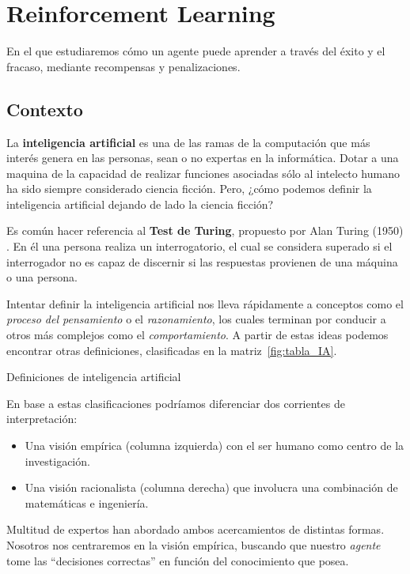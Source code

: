 \chapter{Reinforcement Learning}
\label{cap:reinforcementLearning}

En el que estudiaremos cómo un agente puede aprender a través del éxito y el fracaso, mediante recompensas y penalizaciones.


\section{Contexto}
La \textbf{inteligencia artificial} es una de las ramas de la computación que más interés genera en las personas, sean o no expertas en la informática. Dotar a una maquina de la capacidad de realizar funciones asociadas sólo al intelecto humano ha sido siempre considerado ciencia ficción. Pero, ¿cómo podemos definir la inteligencia artificial dejando de lado la ciencia ficción?

Es común hacer referencia al \textbf{Test de Turing}, propuesto por Alan Turing (1950) . En él una persona realiza un interrogatorio, el cual se considera superado si el interrogador no es capaz de discernir si las respuestas provienen de una máquina o una persona.

Intentar definir la inteligencia artificial nos lleva rápidamente a conceptos como el \textit{proceso del pensamiento} o el \textit{razonamiento}, los cuales terminan por conducir a otros más complejos como el \textit{comportamiento}. A partir de estas ideas podemos encontrar otras definiciones, clasificadas en la matriz~\ref{fig:tabla_IA}.

%
       {Definiciones de inteligencia artificial}

En base a estas clasificaciones podríamos diferenciar dos corrientes de interpretación:
\begin{itemize}
    \item Una visión empírica (columna izquierda) con el ser humano como centro de la investigación.
    \item Una visión racionalista (columna derecha) que involucra una combinación de matemáticas e ingeniería.
\end{itemize}

Multitud de expertos han abordado ambos acercamientos de distintas formas. Nosotros nos centraremos en la visión empírica, buscando que nuestro \textit{agente} tome las ``decisiones correctas'' en función del conocimiento que posea.

